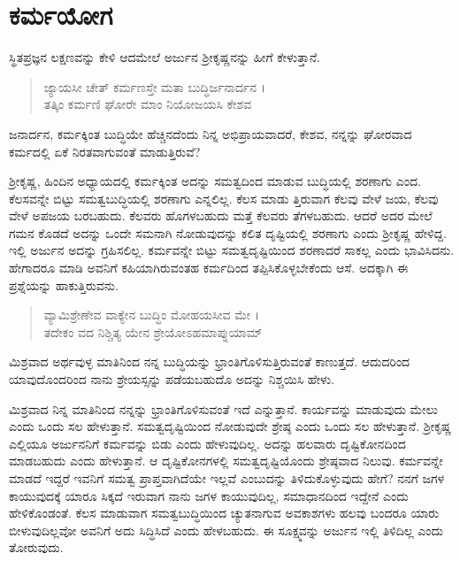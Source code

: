 
\chapter{ಕರ್ಮಯೋಗ}

ಸ್ಥಿತಪ್ರಜ್ಞನ ಲಕ್ಷಣವನ್ನು ಕೇಳಿ ಆದಮೇಲೆ ಅರ್ಜುನ ಶ್ರೀಕೃಷ್ಣನನ್ನು ಹೀಗೆ ಕೇಳುತ್ತಾನೆ.

\begin{verse}
ಜ್ಯಾಯಸೀ ಚೇತ್ ಕರ್ಮಣಸ್ತೇ ಮತಾ ಬುದ್ಧಿರ್ಜನಾರ್ದನ ।\\ತತ್ಕಿಂ ಕರ್ಮಣಿ ಘೋರೇ ಮಾಂ ನಿಯೋಜಯಸಿ ಕೇಶವ 
\end{verse}

{\small ಜನಾರ್ದನ, ಕರ್ಮಕ್ಕಿಂತ ಬುದ್ಧಿಯೇ ಹೆಚ್ಚಿನದೆಂದು ನಿನ್ನ ಅಭಿಪ್ರಾಯವಾದರೆ, ಕೇಶವ, ನನ್ನನ್ನು ಘೋರವಾದ ಕರ್ಮದಲ್ಲಿ ಏಕೆ ನಿರತವಾಗುವಂತೆ ಮಾಡುತ್ತಿರುವೆ?}

ಶ್ರೀಕೃಷ್ಣ, ಹಿಂದಿನ ಅಧ್ಯಾಯದಲ್ಲಿ ಕರ್ಮಕ್ಕಿಂತ ಅದನ್ನು ಸಮತ್ವದಿಂದ ಮಾಡುವ ಬುದ್ಧಿಯಲ್ಲಿ ಶರಣಾಗು ಎಂದ. ಕೆಲಸವನ್ನೇ ಬಿಟ್ಟು ಸಮತ್ವಬುದ್ಧಿಯಲ್ಲಿ ಶರಣಾಗು ಎನ್ನಲಿಲ್ಲ. ಕೆಲಸ ಮಾಡು ತ್ತಿರುವಾಗ ಕೆಲವು ವೇಳೆ ಜಯ, ಕೆಲವು ವೇಳೆ ಅಪಜಯ ಬರಬಹುದು. ಕೆಲವರು ಹೊಗಳಬಹುದು ಮತ್ತೆ ಕೆಲವರು ತೆಗಳಬಹುದು. ಆದರೆ ಅದರ ಮೇಲೆ ಗಮನ ಕೊಡದೆ ಅದನ್ನು ಒಂದೇ ಸಮನಾಗಿ ನೋಡುವುದನ್ನು ಕಲಿತ ದೃಷ್ಟಿಯಲ್ಲಿ ಶರಣಾಗು ಎಂದು ಶ್ರೀಕೃಷ್ಣ ಹೇಳಿದ್ದ. ಇಲ್ಲಿ ಅರ್ಜುನ ಅದನ್ನು ಗ್ರಹಿಸಲಿಲ್ಲ. ಕರ್ಮವನ್ನೇ ಬಿಟ್ಟು ಸಮತ್ವದೃಷ್ಟಿಯಿಂದ ಶರಣಾದರೆ ಸಾಕಲ್ಲ ಎಂದು ಭಾವಿಸಿದನು. ಹೇಗಾದರೂ ಮಾಡಿ ಅವನಿಗೆ ಕಹಿಯಾಗಿರುವಂತಹ ಕರ್ಮದಿಂದ ತಪ್ಪಿಸಿಕೊಳ್ಳಬೇಕೆಂದು ಆಸೆ. ಅದಕ್ಕಾಗಿ ಈ ಪ್ರಶ್ನೆಯನ್ನು ಹಾಕುತ್ತಿರುವನು.

\begin{verse}
ವ್ಯಾಮಿಶ್ರೇಣೇವ ವಾಕ್ಯೇನ ಬುದ್ಧಿಂ ಮೋಹಯಸೀವ ಮೇ ।\\ತದೇಕಂ ವದ ನಿಶ್ಚಿತ್ಯ ಯೇನ ಶ್ರೇಯೋಽಹಮಾಪ್ನುಯಾಮ್ 
\end{verse}

{\small ಮಿಶ್ರವಾದ ಅರ್ಥವುಳ್ಳ ಮಾತಿನಿಂದ ನನ್ನ ಬುದ್ಧಿಯನ್ನು ಭ್ರಾಂತಿಗೊಳಿಸುತ್ತಿರುವಂತೆ ಕಾಣುತ್ತದೆ. ಆದುದರಿಂದ ಯಾವುದೊಂದರಿಂದ ನಾನು ಶ್ರೇಯಸ್ಸನ್ನು ಪಡೆಯಬಹುದೊ ಅದನ್ನು ನಿಶ್ಚಯಿಸಿ ಹೇಳು.}

ಮಿಶ್ರವಾದ ನಿನ್ನ ಮಾತಿನಿಂದ ನನ್ನನ್ನು ಭ್ರಾಂತಿಗೊಳಿಸುವಂತೆ ಇದೆ ಎನ್ನುತ್ತಾನೆ. ಕಾರ್ಯವನ್ನು ಮಾಡುವುದು ಮೇಲು ಎಂದು ಒಂದು ಸಲ ಹೇಳುತ್ತಾನೆ. ಸಮತ್ವದೃಷ್ಟಿಯಿಂದ ನೋಡುವುದೇ ಶ್ರೇಷ್ಠ ಎಂದು ಒಂದು ಸಲ ಹೇಳುತ್ತಾನೆ. ಶ್ರೀಕೃಷ್ಣ ಎಲ್ಲಿಯೂ ಅರ್ಜುನನಿಗೆ ಕರ್ಮವನ್ನು ಬಿಡು ಎಂದು ಹೇಳುವುದಿಲ್ಲ. ಅದನ್ನು ಹಲವಾರು ದೃಷ್ಟಿಕೋನದಿಂದ ಮಾಡಬಹುದು ಎಂದು ಹೇಳುತ್ತಾನೆ. ಆ ದೃಷ್ಟಿಕೋನಗಳಲ್ಲಿ ಸಮತ್ವದೃಷ್ಟಿಯೊಂದು ಶ್ರೇಷ್ಠವಾದ ನಿಲುವು. ಕರ್ಮವನ್ನೇ ಮಾಡದೆ ಇದ್ದರೆ ಇವನಿಗೆ ಸಮತ್ವ ಪ್ರಾಪ್ತವಾಗಿದೆಯೇ ಇಲ್ಲವೆ ಎಂಬುದನ್ನು ತಿಳಿದುಕೊಳ್ಳುವುದು ಹೇಗೆ? ನನಗೆ ಜಗಳ ಕಾಯುವುದಕ್ಕೆ ಯಾರೂ ಸಿಕ್ಕದೆ ಇರುವಾಗ ನಾನು ಜಗಳ ಕಾಯುವುದಿಲ್ಲ, ಸಮಾಧಾನದಿಂದ ಇದ್ದೇನೆ ಎಂದು ಹೇಳಿಕೊಂಡಂತೆ. ಕೆಲಸ ಮಾಡುವಾಗ ಸಮತ್ವಬುದ್ಧಿಯಿಂದ ಚ್ಯುತನಾಗುವ ಅವಕಾಶಗಳು ಹಲವು ಬಂದರೂ ಯಾರು ಬೀಳುವುದಿಲ್ಲವೋ ಅವನಿಗೆ ಅದು ಸಿದ್ಧಿಸಿದೆ ಎಂದು ಹೇಳಬಹುದು. ಈ ಸೂಕ್ಷ್ಮವನ್ನು ಅರ್ಜುನ ಇಲ್ಲಿ ತಿಳಿದಿಲ್ಲ ಎಂದು ತೋರುವುದು.


